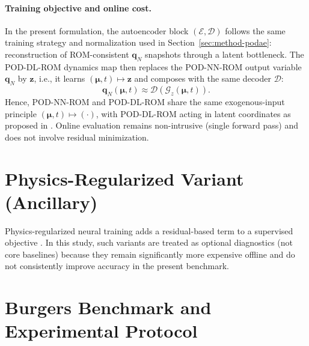 \documentclass[11pt]{article}
\begin{document}
\paragraph{Training objective and online cost.}
In the present formulation, the autoencoder block $(\mathcal E,\mathcal D)$ follows the
same training strategy and normalization used in
Section~\ref{sec:method-podae}: reconstruction of ROM-consistent
$\mathbf q_N$ snapshots through a latent bottleneck. The POD-DL-ROM dynamics map then
replaces the POD-NN-ROM output variable $\mathbf q_N$ by $\mathbf z$, i.e., it learns
$(\bm\mu,t)\mapsto\mathbf z$ and composes with the same decoder $\mathcal D$:
\begin{equation}
\mathbf q_N(\bm\mu,t)\approx \mathcal D\!\left(\mathcal G_z(\bm\mu,t)\right).
\end{equation}
Hence, POD-NN-ROM and POD-DL-ROM share the same exogenous-input principle
$(\bm\mu,t)\mapsto(\cdot)$, with POD-DL-ROM acting in latent coordinates as proposed in
\cite{fresca2022pod}. Online evaluation remains non-intrusive (single forward pass)
and does not involve residual minimization.

\section{Physics-Regularized Variant (Ancillary)}
\label{sec:prnn-note}

Physics-regularized neural training adds a residual-based term to a supervised objective \cite{chen2021physics,sibuet2025discrete}. In this study, such variants are treated as optional diagnostics (not core baselines) because they remain significantly more expensive offline and do not consistently improve accuracy in the present benchmark.

\section{Burgers Benchmark and Experimental Protocol}
\label{sec:burgers}
\end{document}
